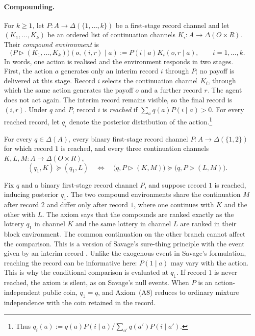 \documentclass[11pt,a4paper]{article}
\theoremstyle{definition}
\newcommand{\D}{\Delta}
\newcommand{\1}{\mathbf 1}
\begin{document}
\paragraph{Compounding.}
For $k\ge1$, let $P:A\to\D(\{1,\ldots,k\})$ be a first-stage record channel and let
$(K_1,\ldots,K_k)$ be an ordered list of continuation channels $K_i:A\to\D(O\times R)$.  Their
\emph{compound environment} is
\begin{equation}
 \bigl(P\triangleright(K_1,\ldots,K_k)\bigr)(o,(i,r)\mid a)
 :=P(i\mid a)K_i(o,r\mid a),
 \qquad i=1,\ldots,k.
 \label{eq:compound}
\end{equation}
In words, one action is realised and the environment responds in two stages.  First, the action $a$ generates only
an interim record $i$ through $P$; no payoff is delivered at this stage.  Record $i$ selects the continuation
channel $K_i$, through which the same action generates the payoff $o$ and a further record $r$.  The agent does not
act again.  The interim record remains visible, so the final record is $(i,r)$.  Under $q$ and $P$, record $i$ is
\emph{reached} if $\sum_aq(a)P(i\mid a)>0$.  For every reached record, let $q_i$ denote the posterior distribution
of the action.\footnote{Thus $q_i(a):=q(a)P(i\mid a)/\sum_{a'}q(a')P(i\mid a')$.}

\begin{description}[leftmargin=*,style=sameline]

\item[(A8) Recordwise sure-thing principle.]
For every $q\in\D(A)$, every binary first-stage record channel $P:A\to\D(\{1,2\})$ for which record $1$ is
reached, and every three continuation channels $K,L,M:A\to\D(O\times R)$,
\begin{equation}
 (q_1,K)\succeq(q_1,L)
 \quad\Longleftrightarrow\quad
 \bigl(q,P\triangleright(K,M)\bigr)
 \succeq
 \bigl(q,P\triangleright(L,M)\bigr).
 \label{eq:recordwise-sure-thing}
\end{equation}

Fix $q$ and a binary first-stage record channel $P$, and suppose record $1$ is reached, inducing posterior $q_1$.
The two compound environments share the continuation $M$ after record $2$ and differ only after record $1$, where
one continues with $K$ and the other with $L$.  The axiom says that the compounds are ranked exactly as the lottery
$q_1$ in channel $K$ and the same lottery in channel $L$ are ranked in their block environment.  The common
continuation on the other branch cannot affect the comparison.  This is a version of Savage's sure-thing principle
with the event given by an interim record \cite{Savage1954}.  Unlike the exogenous event in Savage's formulation,
reaching the record can be informative here: $P(1\mid a)$ may vary with the action.  This is why the conditional
comparison is evaluated at $q_1$.  If record $1$ is never reached, the axiom is silent, as on Savage's null
events.  When $P$ is an action-independent public coin, $q_1=q$, and
Axiom~\textup{(A8)} reduces to ordinary mixture independence with the coin retained in the record.

\end{description}
\end{document}
